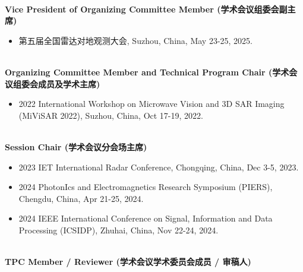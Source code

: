 \documentclass[paper=a4,fontsize=11pt]{scrartcl}
\begin{document}
~\\
\textbf{Vice President of Organizing Committee Member (学术会议组委会副主席)} 
\begin{itemize}
	\item 第五届全国雷达对地观测大会, Suzhou, China, May 23-25, 2025.
\end{itemize}
~\\
\textbf{Organizing Committee Member and Technical Program Chair (学术会议组委会成员及学术主席)} 
\begin{itemize}
	\item 2022 International Workshop on Microwave Vision and 3D SAR Imaging (MiViSAR 2022), Suzhou, China, Oct 17-19, 2022.
\end{itemize}
~\\
\textbf{Session Chair (学术会议分会场主席)} 
\begin{itemize}
	\item 2023 IET International Radar Conference, Chongqing, China, Dec 3-5, 2023.
	\item 2024 PhotonIcs and Electromagnetics Research Symposium (PIERS), Chengdu, China, Apr 21-25, 2024.
	\item 2024 IEEE International Conference on Signal, Information and Data Processing (ICSIDP), Zhuhai, China, Nov 22-24, 2024.
\end{itemize}
~\\
\textbf{TPC Member / Reviewer (学术会议学术委员会成员 / 审稿人)} 
\end{document}
